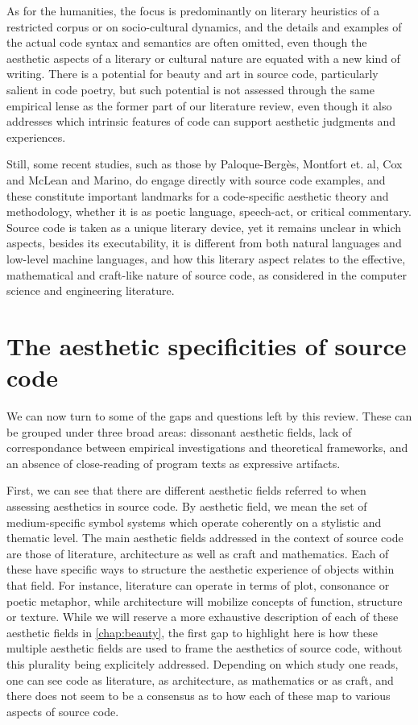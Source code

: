 As for the humanities, the focus is predominantly on literary heuristics of a restricted corpus or on socio-cultural dynamics, and the details and examples of the actual code syntax and semantics are often omitted, even though the aesthetic aspects of a literary or cultural nature are equated with a new kind of writing. There is a potential for beauty and art in source code, particularly salient in code poetry, but such potential is not assessed through the same empirical lense as the former part of our literature review, even though it also addresses which intrinsic features of code can support aesthetic judgments and experiences.

Still, some recent studies, such as those by Paloque-Bergès, Montfort et. al, Cox and McLean and Marino, do engage directly with source code examples, and these constitute important landmarks for a code-specific aesthetic theory and methodology, whether it is as poetic language, speech-act, or critical commentary. Source code is taken as a unique literary device, yet it remains unclear in which aspects, besides its executability, it is different from both natural languages and low-level machine languages, and how this literary aspect relates to the effective, mathematical and craft-like nature of source code, as considered in the computer science and engineering literature.

\section{The aesthetic specificities of source code}
\label{sec:aesthetic-specificities-code}

We can now turn to some of the gaps and questions left by this review. These can be grouped under three broad areas: dissonant aesthetic fields, lack of correspondance between empirical investigations and theoretical frameworks, and an absence of close-reading of program texts as expressive artifacts.

First, we can see that there are different aesthetic fields referred to when assessing aesthetics in source code. By aesthetic field, we mean the set of medium-specific symbol systems which operate coherently on a stylistic and thematic level. The main aesthetic fields addressed in the context of source code are those of literature, architecture as well as craft and mathematics. Each of these have specific ways to structure the aesthetic experience of objects within that field. For instance, literature can operate in terms of plot, consonance or poetic metaphor, while architecture will mobilize concepts of function, structure or texture. While we will reserve a more exhaustive description of each of these aesthetic fields in \autoref{chap:beauty}, the first gap to highlight here is how these multiple aesthetic fields are used to frame the aesthetics of source code, without this plurality being explicitely addressed. Depending on which study one reads, one can see code as literature, as architecture, as mathematics or as craft, and there does not seem to be a consensus as to how each of these map to various aspects of source code.

